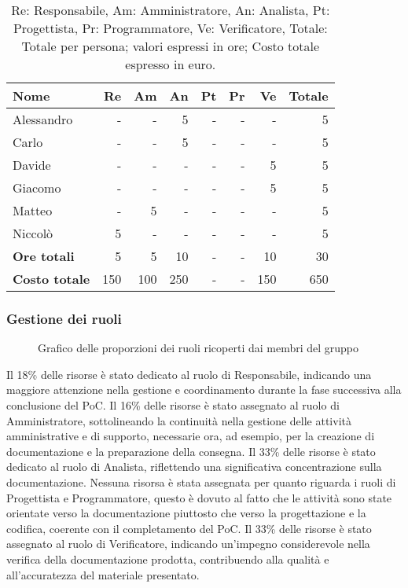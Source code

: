 \begin{table}[H]
	\centering
	\begin{tabular}{l|r|r|r|r|r|r|r}
	\textbf{Nome} & \textbf{Re} & \textbf{Am} & \textbf{An} & \textbf{Pt} & \textbf{Pr} & \textbf{Ve} & \textbf{Totale} \\
	\hline
	Alessandro & - & - & 5 & - & - & - & 5 \\
	Carlo & - & - & 5 & - & - & - & 5 \\
	Davide & - & - & - & - & - & 5 & 5 \\
	Giacomo & - & - & - & - & - & 5 & 5 \\
	Matteo & - & 5 & - & - & - & - & 5 \\
	Niccolò & 5 & - & - & - & - & - & 5 \\
	\hline
	\textbf{Ore totali} & 5 & 5 & 10 & - & - & 10 & 30 \\
	\textbf{Costo totale} & 150 & 100 & 250 & - & - & 150 & 650
	\end{tabular}
	\caption{Re: Responsabile, Am: Amministratore, An: Analista, Pt: Progettista,
		Pr: Programmatore, Ve: Verificatore, Totale: Totale per persona; valori espressi in ore; Costo totale espresso in euro.} 
\end{table}

\subsubsection{Gestione dei ruoli}

\begin{figure}[h]
	\centering
    \caption{Grafico delle proporzioni dei ruoli ricoperti dai membri del gruppo}
\end{figure}

Il 18\% delle risorse è stato dedicato al ruolo di Responsabile, indicando una maggiore attenzione nella gestione e coordinamento 
durante la fase successiva alla conclusione del PoC.
Il 16\% delle risorse è stato assegnato al ruolo di Amministratore, sottolineando la continuità nella gestione delle attività amministrative e di supporto, necessarie ora, ad esempio, per la creazione di documentazione e la preparazione della consegna.
Il 33\% delle risorse è stato dedicato al ruolo di Analista, riflettendo una significativa concentrazione sulla documentazione.
Nessuna risorsa è stata assegnata per quanto riguarda i ruoli di Progettista e Programmatore, questo è dovuto al fatto che le attività sono state orientate verso la documentazione piuttosto che verso la progettazione e la codifica, coerente con il completamento del PoC.
Il 33\% delle risorse è stato assegnato al ruolo di Verificatore, indicando un'impegno considerevole nella verifica della documentazione prodotta, contribuendo alla qualità e all'accuratezza del materiale presentato.
